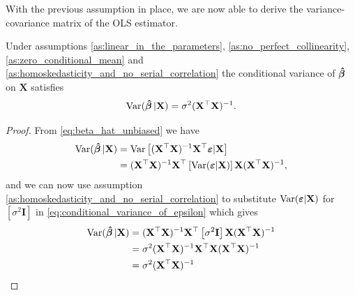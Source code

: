 With the previous assumption in place, we are now able to derive the variance-covariance matrix of the OLS estimator.
\begin{theorem}\label{th:variance-covariance_of_the_ols_estimator}
    Under assumptions \ref{as:linear_in_the_parameters}, \ref{as:no_perfect_collinearity}, \ref{as:zero_conditional_mean} and \ref{as:homoskedasticity_and_no_serial_correlation} the conditional variance of $\operatorname{\boldsymbol{\hat{\beta}}}$ on $\mathbf{X}$ satisfies \cite[p. 811]{Wooldridge2012} 
    \begin{align*}
        \operatorname{\text{Var}}(\operatorname{\boldsymbol{\hat{\beta}}} | \mathbf{X}) = \sigma^2(\mathbf{X}^\top\mathbf{X})^{-1}.
    \end{align*}
\end{theorem}
\begin{proof}
    From \eqref{eq:beta_hat_unbiased} we have
    \begin{align}
        \operatorname{\text{Var}}(\operatorname{\boldsymbol{\hat{\beta}}} | \mathbf{X}) &= \operatorname{\text{Var}}\left[ (\mathbf{X}^\top\mathbf{X})^{-1}\mathbf{X}^\top\boldsymbol{\varepsilon}|\mathbf{X} \right] \nonumber\\
        &= (\mathbf{X}^\top\mathbf{X})^{-1}\mathbf{X}^\top\left[ \operatorname{\text{Var}}(\boldsymbol{\varepsilon} | \mathbf{X}) \right] \mathbf{X}(\mathbf{X}^\top\mathbf{X})^{-1}, \label{eq:conditional_variance_of_epsilon}
    \end{align}
    and we can now use assumption \ref{as:homoskedasticity_and_no_serial_correlation} to substitute $\operatorname{\text{Var}}(\boldsymbol{\varepsilon}|\mathbf{X})$ for $\left[\sigma^2 \mathbf{I}\right]$ in \eqref{eq:conditional_variance_of_epsilon} which gives
    \begin{align*}
        \operatorname{\text{Var}}(\operatorname{\boldsymbol{\hat{\beta}}} | \mathbf{X}) &= (\mathbf{X}^\top\mathbf{X})^{-1}\mathbf{X}^\top\left[\sigma^2 \mathbf{I}\right] \mathbf{X}(\mathbf{X}^\top\mathbf{X})^{-1} \\
        &= \sigma^2(\mathbf{X}^\top\mathbf{X})^{-1}\mathbf{X}^\top \mathbf{X}(\mathbf{X}^\top\mathbf{X})^{-1} \\
        &= \sigma^2(\mathbf{X}^\top\mathbf{X})^{-1}
    \end{align*}
\end{proof}

